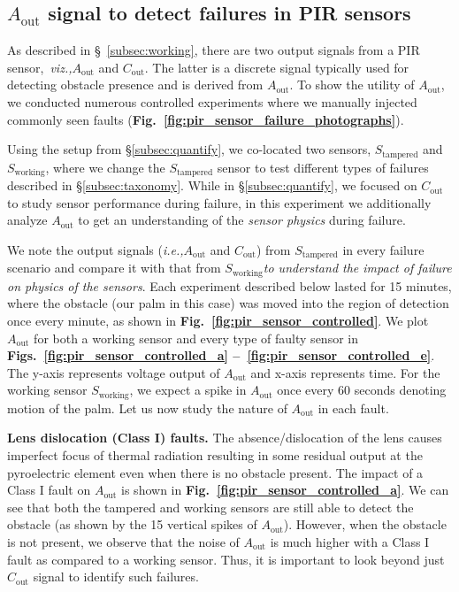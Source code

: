 \documentclass[manuscript]{acmart}
\newcommand{\viz}{{\it viz.,}\xspace}
\newcommand{\ie}{{\it i.e.,}\xspace}
\newcommand{\cout}{$C_{\text{out}}$\xspace}
\newcommand{\aout}{$A_{\text{out}}$\xspace}
\newcommand{\tampered}{$S_{\text{tampered}}$\xspace}
\newcommand{\working}{$S_{\text{working}}$\xspace}
\begin{document}
\subsection{\aout signal to detect failures in PIR sensors}
\label{subsec:controlled}
As described in \S~\ref{subsec:working}, there are two output signals from a PIR sensor,~\viz \aout and \cout. 
The latter is a discrete signal typically used for detecting obstacle presence and is derived from \aout.
To show the utility of \aout, we conducted numerous controlled experiments where we manually injected commonly seen faults ({\bfseries Fig.~\ref{fig:pir_sensor_failure_photographs}}). 




Using the setup from {\S\ref{subsec:quantify}}, we co-located two sensors, \tampered and \working, where we change the \tampered sensor to test different types of failures described in \S\ref{subsec:taxonomy}. While in \S\ref{subsec:quantify}, we focused on \cout to study sensor performance during failure, in this experiment we additionally analyze \aout to get an understanding of the \textit{sensor physics} during failure.

We note the output signals (\ie \aout and \cout) from \tampered in every failure scenario and compare it with that from \working \emph{to understand the impact of failure on physics of the sensors}. Each experiment described below lasted for 15 minutes, where the obstacle (our palm in this case) was moved into the region of detection once every minute, as shown in {\bfseries Fig.~\ref{fig:pir_sensor_controlled}}. We plot \aout for both a working sensor and every type of faulty sensor in {\bfseries Figs.~\ref{fig:pir_sensor_controlled_a} --~\ref{fig:pir_sensor_controlled_e}}. The y-axis represents voltage output of \aout and x-axis represents time. For the working sensor \working, we expect a spike in \aout once every 60 seconds denoting motion of the palm. Let us now study the nature of \aout in each fault.

\textbf{Lens dislocation (Class I) faults.} The absence/dislocation of the lens causes imperfect focus of thermal radiation resulting in some residual output at the pyroelectric element even when there is no obstacle present. The impact of a Class I fault on \aout is shown in \textbf{Fig.~\ref{fig:pir_sensor_controlled_a}}. 
We can see that both the tampered and working sensors are still able to detect the obstacle (as shown by the 15 vertical spikes of \aout). However, when the obstacle is not present, we observe that the noise of \aout is much higher with a Class I fault as compared to a working sensor. Thus, it is important to look beyond just \cout signal to identify such failures.
\end{document}
